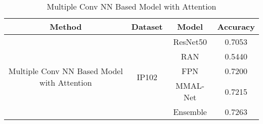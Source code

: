 \begin{table}[!htbp]
\centering
\begin{tabular}{|c|c|c|c|}
\hline
\textbf{Method} & \textbf{Dataset} & \textbf{Model} & \textbf{Accuracy}\\
\hline
\multirow{5}{6em}{Multiple Conv NN Based Model with Attention} & \multirow{5}{2.5em}{IP102} & ResNet50 & 0.7053\\\cline{3-4}
& & RAN & 0.5440\\\cline{3-4}
& & FPN & 0.7200\\\cline{3-4}
& & MMAL-Net & 0.7215\\\cline{3-4}
& & Ensemble & 0.7263\\\cline{3-4}
\hline
\end{tabular}
\caption{Multiple Conv NN Based Model with Attention}
\end{table}
